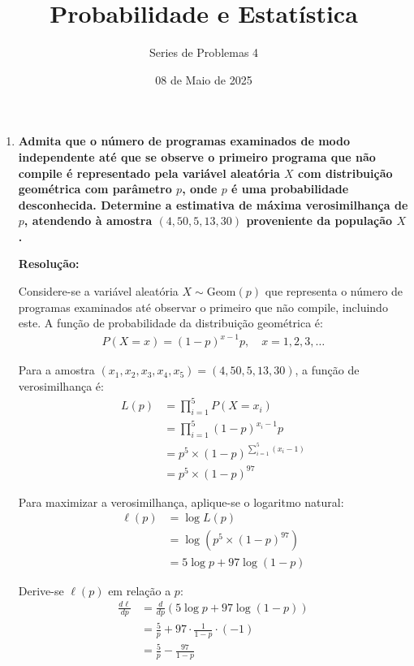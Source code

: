 \documentclass[a4paper,12pt]{article}
\author{Series de Problemas 4}
\begin{document}
\title{Probabilidade e Estatística}
\date{08 de Maio de 2025}
\maketitle

\begin{enumerate}
    \item \textbf{Admita que o número de programas examinados de modo independente até que se observe o primeiro programa que não compile é representado pela variável aleatória \( X \) com distribuição geométrica com parâmetro \( p \), onde \( p \) é uma probabilidade desconhecida. Determine a estimativa de máxima verosimilhança de \( p \), atendendo à amostra \( (4, 50, 5, 13, 30) \) proveniente da população \( X \).}

    \vspace{0.3cm}

    \begin{mdframed}[backgroundcolor=gray!10, linewidth=0pt, innertopmargin=10pt, innerbottommargin=10pt]
    \textbf{Resolução:}

    Considere-se a variável aleatória $X \sim \text{Geom}(p)$ que representa o número de programas examinados até observar o primeiro que não compile, incluindo este. A função de probabilidade da distribuição geométrica é:
    \begin{align*}
    P(X = x) = (1 - p)^{x - 1} p, \quad x = 1, 2, 3, \ldots
    \end{align*}

    Para a amostra $(x_1, x_2, x_3, x_4, x_5) = (4, 50, 5, 13, 30)$, a função de verosimilhança é:
    \begin{align*}
    L(p) &= \prod_{i=1}^5 P(X = x_i) \\
    &= \prod_{i=1}^5 (1 - p)^{x_i - 1} p \\
    &= p^5 \times (1 - p)^{\sum_{i=1}^5 (x_i - 1)} \\
    &= p^5 \times (1 - p)^{97}
    \end{align*}

    Para maximizar a verosimilhança, aplique-se o logaritmo natural:
    \begin{align*}
    \ell(p) &= \log L(p) \\
    &= \log \left( p^5 \times (1 - p)^{97} \right) \\
    &= 5 \log p + 97 \log(1-p)
    \end{align*}

    Derive-se $\ell(p)$ em relação a $p$:
    \begin{align*}
    \frac{d\ell}{dp} &= \frac{d}{dp} \left( 5 \log p + 97 \log(1-p) \right) \\
    &= \frac{5}{p} + 97 \cdot \frac{1}{1-p} \cdot (-1) \\
    &= \frac{5}{p} - \frac{97}{1-p}
    \end{align*}


\end{mdframed}
\end{enumerate}
\end{document}
